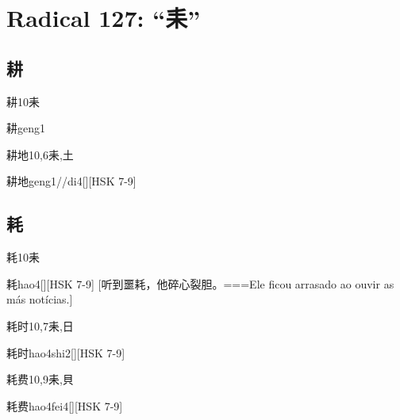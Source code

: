 \section*{Radical 127: ``⽾''}

\subsection*{耕}

\begin{Entry}{耕}{10}{⽾}
  \begin{Phonetics}{耕}{geng1}
  \end{Phonetics}
\end{Entry}

\begin{Entry}{耕地}{10,6}{⽾,⼟}
  \begin{Phonetics}{耕地}{geng1//di4}[][HSK 7-9]
  \end{Phonetics}
\end{Entry}

\subsection*{耗}

\begin{Entry}{耗}{10}{⽾}
  \begin{Phonetics}{耗}{hao4}[][HSK 7-9]
    [听到噩耗，他碎心裂胆。===Ele ficou arrasado ao ouvir as más notícias.]
  \end{Phonetics}
\end{Entry}

\begin{Entry}{耗时}{10,7}{⽾,⽇}
  \begin{Phonetics}{耗时}{hao4shi2}[][HSK 7-9]
  \end{Phonetics}
\end{Entry}

\begin{Entry}{耗费}{10,9}{⽾,⾙}
  \begin{Phonetics}{耗费}{hao4fei4}[][HSK 7-9]
  \end{Phonetics}
\end{Entry}


